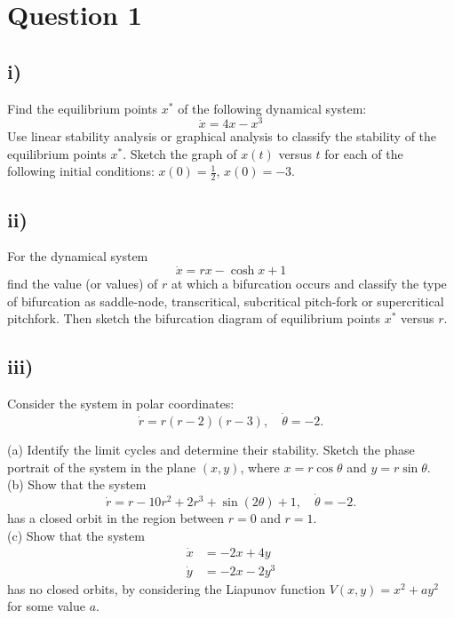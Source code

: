 \documentclass[12pt]{article}
\begin{document}
\section*{Question 1}
\subsection*{i)}
Find the equilibrium points $x^*$ of the following dynamical system:
$$\dot{x} = 4x - x^3$$
Use linear stability analysis or graphical analysis to classify the stability of the equilibrium points $x^*$.
Sketch the graph of $x(t)$ versus $t$ for each of the following initial conditions: $x(0) = \frac{1}{2}$, $x(0) = -3$.
\subsection*{ii)}
For the dynamical system
$$\dot{x} = rx - \cosh x +1$$
find the value (or values) of $r$ at which a bifurcation occurs and classify
the type of bifurcation as saddle-node, transcritical, subcritical pitch-fork or supercritical pitchfork. Then sketch the bifurcation diagram of
equilibrium points $x^*$ versus $r$.
\subsection*{iii)}
Consider the system in polar coordinates:
\[
\dot{r} = r(r - 2)(r - 3), \quad \dot{\theta} = -2.
\]

(a) Identify the limit cycles and determine their stability. Sketch the phase portrait of the system in the plane $(x, y)$, where $x = r \cos \theta$ and $y = r \sin \theta$. 
\\
(b) Show that the system
\[
\dot{r} = r - 10r^2 + 2r^3 + \sin (2\theta) + 1, \quad \dot{\theta} = -2.
\]
has a closed orbit in the region between $r = 0$ and $r = 1$.
\\
(c) Show that the system \begin{align*}
\dot{x}&=-2x+4y
\\ \dot{y}&=-2x-2y^3
\end{align*}
has no closed orbits, by considering the Liapunov function $V(x,y)=x^2+ay^2$ for some value $a$.
\end{document}
